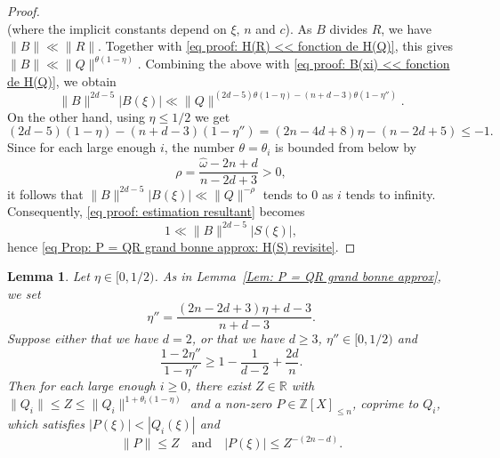 \documentclass[JEP,XML,SOM,Unicode,NoFloatCountersInSection,published]{cedram}
\newcommand\bR{\mathbb{R}}
\newcommand\bZ{\mathbb{Z}}
\newcommand\homega{\widehat{\omega}}\newcommand\HH{\mathcal{H}}
\newcommand{\normH}[1]{\|#1\|}
\newcommand\AND{\quad\text{and}\quad}
\theoremstyle{definition}
\theoremstyle{plain}
\newtheorem{Lem}[Def]{Lemma}
\begin{document}
\begin{proof}
\begin{equation}
\end{equation}
(where the implicit constants depend on $\xi$, $n$ and $c$). As $B$ divides $R$, we have $\normH{B}\ll \normH{R}$. Together with \eqref{eq proof: H(R) << fonction de H(Q)}, this gives $\normH{B} \ll \normH{Q}^{\theta(1-\eta)}$. Combining the above with \eqref{eq proof: B(xi) << fonction de H(Q)}, we obtain
\begin{equation*}
\normH{B}^{2d-5}|B(\xi)| \ll \normH{Q}^{(2d-5)\theta(1-\eta)-(n+d-3)\theta(1-\eta'')}.
\end{equation*}
On the other hand, using $\eta\leq 1/2$ we get
\begin{equation*}
(2d-5)(1-\eta)-(n+d-3)(1-\eta'')= (2n-4d+8)\eta - (n-2d+5) \leq -1.
\end{equation*}
Since for each large enough $i$, the number $\theta = \theta_i$ is bounded from below by
\[
\rho = \frac{\homega-2n+d}{n-2d+3} > 0,
\]
it follows that $ \normH{B}^{2d-5}|B(\xi)| \ll \normH{Q}^{-\rho}$ tends to $0$ as $i$ tends to infinity. Consequently, \eqref{eq proof: estimation resultant} becomes
\begin{equation*}
1 \ll \normH{B}^{2d-5}|S(\xi)|,
\end{equation*}
hence \eqref{eq Prop: P = QR grand bonne approx: H(S) revisite}.
\end{proof}

\begin{Lem}
\label{Prop-clef: existence d'un bon point min successeur}
Let $\eta\in[0,1/2)$. As in Lemma~\ref{Lem: P = QR grand bonne approx}, we set
\[
\eta'' = \frac{(2n-2d+3)\eta+d-3}{n+d-3}.
\]
Suppose either that we have $d=2$, or that we have $d\ge 3$, $\eta''\in [0,1/2)$ and
\begin{equation}
\label{eq Prop: inegalite pour eta}
\frac{1-2\eta''}{1-\eta''} \geq 1-\frac{1}{d-2} + \frac{2d}{n}.
\end{equation}
Then for each large enough $i\geq 0$, there exist $Z\in \bR$ with $\normH{Q_i}\leq Z \leq \normH{Q_i}^{1+\theta_i(1-\eta)}$ and a non-zero $P\in\bZ[X]_{\leq n}$, coprime to $Q_i$, which satisfies $|P(\xi)| < |Q_i(\xi)|$ and
\begin{equation}
\label{eq Prop: system sol premiere avec Q_i}
\normH{P} \leq Z \AND |P(\xi)| \leq Z^{-(2n-d)}.
\end{equation}
\end{Lem}
\end{document}
